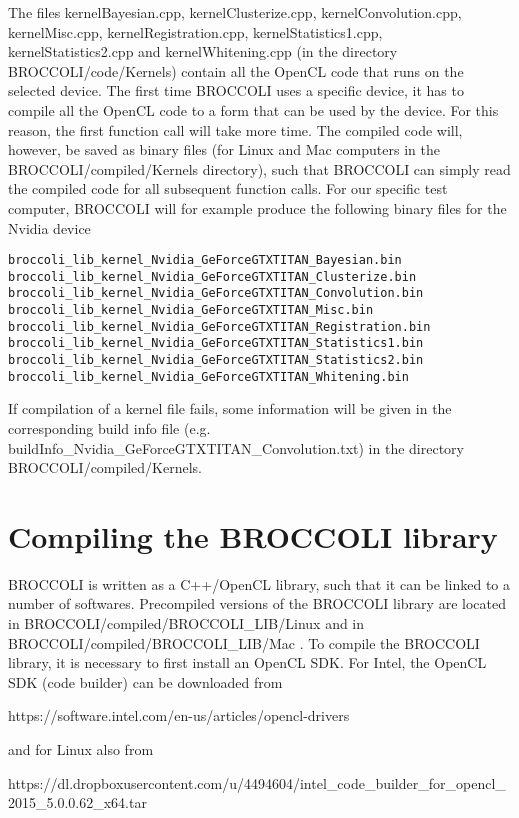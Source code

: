 The files kernelBayesian.cpp, kernelClusterize.cpp, kernelConvolution.cpp, kernelMisc.cpp, kernelRegistration.cpp, kernelStatistics1.cpp, kernelStatistics2.cpp and kernelWhitening.cpp (in the directory BROCCOLI/code/Kernels) contain all the OpenCL code that runs on the selected device. The first time BROCCOLI uses a specific device, it has to compile all the OpenCL code to a form that can be used by the device. For this reason, the first function call will take more time. The compiled code will, however, be saved as binary files (for Linux and Mac computers in the BROCCOLI/compiled/Kernels directory), such that BROCCOLI can simply read the compiled code for all subsequent function calls. For our specific test computer, BROCCOLI will for example produce the following binary files for the Nvidia device

\begin{verbatim}
broccoli_lib_kernel_Nvidia_GeForceGTXTITAN_Bayesian.bin
broccoli_lib_kernel_Nvidia_GeForceGTXTITAN_Clusterize.bin 
broccoli_lib_kernel_Nvidia_GeForceGTXTITAN_Convolution.bin
broccoli_lib_kernel_Nvidia_GeForceGTXTITAN_Misc.bin 
broccoli_lib_kernel_Nvidia_GeForceGTXTITAN_Registration.bin
broccoli_lib_kernel_Nvidia_GeForceGTXTITAN_Statistics1.bin
broccoli_lib_kernel_Nvidia_GeForceGTXTITAN_Statistics2.bin
broccoli_lib_kernel_Nvidia_GeForceGTXTITAN_Whitening.bin
\end{verbatim}

If compilation of a kernel file fails, some information will be given in the corresponding build info file (e.g. buildInfo\_Nvidia\_GeForceGTXTITAN\_Convolution.txt) in the directory BROCCOLI/compiled/Kernels. 

\section{Compiling the BROCCOLI library}

BROCCOLI is written as a C++/OpenCL library, such that it can be linked to a number of softwares. Precompiled versions of the BROCCOLI library are located in BROCCOLI/compiled/BROCCOLI\_LIB/Linux and in BROCCOLI/compiled/BROCCOLI\_LIB/Mac . To compile the BROCCOLI library, it is necessary to first install an OpenCL SDK. For Intel, the OpenCL SDK (code builder) can be downloaded from

https://software.intel.com/en-us/articles/opencl-drivers 

and for Linux also from

https://dl.dropboxusercontent.com/u/4494604/intel\_code\_builder\_for\_opencl\_2015\_5.0.0.62\_x64.tar

